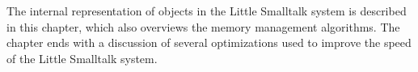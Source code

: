 \secdown

The internal representation of objects in the Little Smalltalk system is
described in this chapter, which also overviews the memory management algorithms. 
The chapter ends with a discussion of several optimizations used to 
improve the speed of the Little Smalltalk system.


\secup
